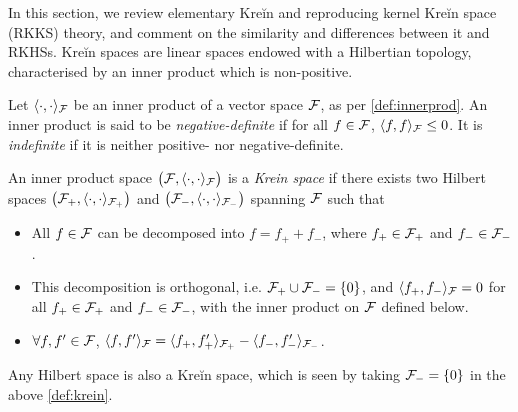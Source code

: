 In this section, we review elementary Kreĭn and reproducing kernel Kreĭn space (RKKS) theory, and comment on the similarity and differences between it and RKHSs.
Kreĭn spaces are linear spaces endowed with a Hilbertian topology, characterised by an inner product which is non-positive.

\begin{definition}
  Let $\langle\cdot,\cdot\rangle_{\mathcal F}$ be an inner product of a vector space ${\mathcal F}$, as per \cref{def:innerprod}.
  An inner product is said to be \emph{negative-definite} if for all $f\in{\mathcal F}$, $\langle f,f\rangle_{\mathcal F} \leq 0$.
  It is \emph{indefinite} if it is neither positive- nor negative-definite.
\end{definition}

\begin{definition}\label{def:krein}
  An inner product space $\big({\mathcal F},\langle\cdot,\cdot\rangle_{\mathcal F}\big)$ is a \emph{Krein space} if there exists two Hilbert spaces $\big({\mathcal F}_+,\langle\cdot,\cdot\rangle_{{\mathcal F}_+}\big)$ and $\big({\mathcal F}_-,\langle\cdot,\cdot\rangle_{{\mathcal F}_-}\big)$ spanning ${\mathcal F}$ such that
  \begin{itemize}
    \item All $f\in{\mathcal F}$ can be decomposed into $f = f_+ + f_-$, where $f_+\in{\mathcal F}_+$ and $f_- \in {\mathcal F}_-$.
    \item This decomposition is orthogonal, i.e. ${\mathcal F}_+ \cup {\mathcal F}_- = \{0\}$, and $\langle f_+,f_-\rangle_{\mathcal F}=0$ for all $f_+\in{\mathcal F}_+$ and $f_-\in{\mathcal F}_-$, with the inner product on ${\mathcal F}$ defined below.
    \item $\forall f,f'\in{\mathcal F}$, $\langle f,f'\rangle_{\mathcal F} = \langle f_+,f_+'\rangle_{{\mathcal F}_+}- \langle f_-,f_-'\rangle_{{\mathcal F}_-}$.
  \end{itemize}
\end{definition}

\begin{remark}
  Any Hilbert space is also a Kreĭn space, which is seen by taking ${\mathcal F}_- = \{0\}$ in the above \cref{def:krein}.
\end{remark}

